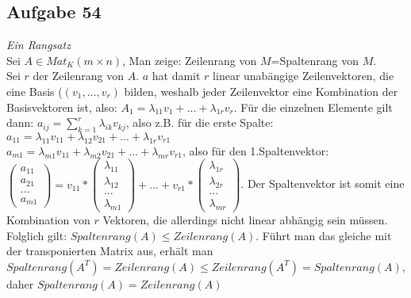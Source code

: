 \documentclass[12pt]{article}
\begin{document}
\subsection*{Aufgabe 54}\textit{Ein Rangsatz}\\
Sei $A\in Mat_K(m\times n)$, Man zeige: Zeilenrang von $M$=Spaltenrang von $M$.\\
Sei $r$ der Zeilenrang von $A$. $a$ hat damit $r$ linear unab{\"a}ngige Zeilenvektoren, die eine Basis ($(v_1,...,v_r)$ bilden, weshalb jeder Zeilenvektor eine Kombination der Basisvektoren ist, also: $A_1=\lambda_{11}v_1+...+\lambda_{1r}v_r$. F{\"u}r die einzelnen Elemente gilt dann: $a_{ij}=\sum_{k=1}^r\lambda_{ik}v_{kj}$, also z.B. f{\"u}r die erste Spalte:\\
$a_{11}=\lambda_{11}v_{11}+\lambda_{12}v_{21}+...+\lambda_{1r}v_{r1}$\\
$a_{m1}=\lambda_{m1}v_{11}+\lambda_{m2}v_{21}+...+\lambda_{mr}v_{r1}$, also f{\"u}r den 1.Spaltenvektor:\\
$\begin{pmatrix}
a_{11} \\ a_{21} \\ ... \\ a_{m1}
\end{pmatrix}=v_{11}*\begin{pmatrix}
\lambda_{11} \\ \lambda_{12} \\ ... \\ \lambda_{m1}
\end{pmatrix}+...+v_{r1}*\begin{pmatrix}
\lambda_{1r} \\ \lambda_{2r} \\ ... \\ \lambda_{mr}
\end{pmatrix}$. Der Spaltenvektor ist somit eine Kombination von $r$ Vektoren, die allerdings nicht linear abh{\"a}ngig sein m{\"u}ssen. Folglich gilt: $Spaltenrang(A)\leq Zeilenrang(A)$. F{\"u}hrt man das gleiche mit der transponierten Matrix aus, erh{\"a}lt man $Spaltenrang(A^T)=Zeilenrang(A)\leq Zeilenrang(A^T)=Spaltenrang(A)$, daher $Spaltenrang(A)=Zeilenrang(A)$ 
\end{document}
